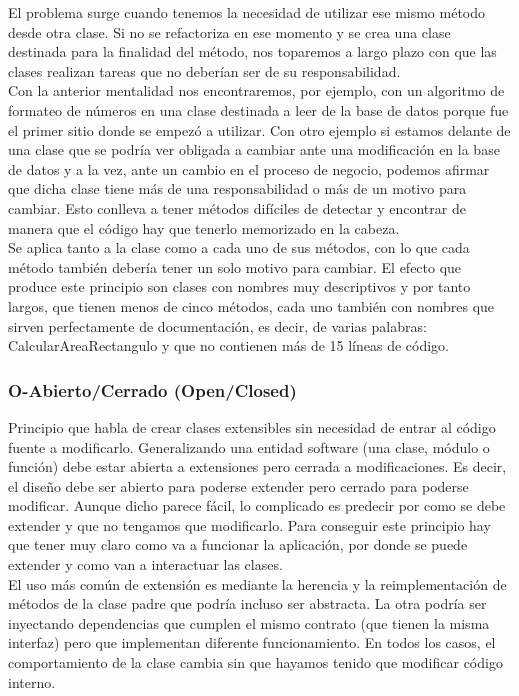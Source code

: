 \documentclass[../pfc.tex]{subfiles}
\begin{document}
	El problema surge cuando tenemos la necesidad de utilizar ese mismo método desde otra clase. Si no se refactoriza en ese momento y se crea una clase destinada para la finalidad del método, nos toparemos a largo plazo con que las clases realizan tareas que no deberían ser de su responsabilidad.\\
	
	Con la anterior mentalidad nos encontraremos, por ejemplo, con un algoritmo de formateo de números en una clase destinada a leer de la base de datos porque fue el primer sitio donde se empezó a utilizar. Con otro ejemplo si estamos delante de una clase que se podría ver obligada a cambiar ante una modificación en la base de datos y a la vez, ante un cambio en el proceso de negocio, podemos afirmar que dicha clase tiene más de una responsabilidad o más de un motivo para cambiar. Esto conlleva a tener métodos difíciles de detectar y encontrar de manera que el código hay que tenerlo memorizado en la cabeza.\\
	
	Se aplica tanto a la clase como a cada uno de sus métodos, con lo que cada método también debería tener un solo motivo para cambiar. El efecto que produce este principio son clases con nombres muy descriptivos y por tanto largos, que tienen menos de cinco métodos, cada uno también con nombres que sirven perfectamente de documentación, es decir, de varias palabras: CalcularAreaRectangulo y que no contienen más de 15 líneas de código.\\
	
	
	\subsubsection{O-Abierto/Cerrado (Open/Closed)}
	
	Principio que habla de crear clases extensibles sin necesidad de entrar al código fuente a modificarlo. Generalizando una entidad software (una clase, módulo o función) debe estar abierta a extensiones pero cerrada a modificaciones. Es decir, el diseño debe ser abierto para poderse extender pero cerrado para poderse modificar. Aunque dicho parece fácil, lo complicado es predecir por como se debe extender y que no tengamos que modificarlo. Para conseguir este principio hay que tener muy claro como va a funcionar la aplicación, por donde se puede extender y como van a interactuar las clases.\\
	
	El uso más común de extensión es mediante la herencia y la reimplementación de métodos de la clase padre que podría incluso ser abstracta. La otra podría ser inyectando dependencias que cumplen el mismo contrato (que tienen la misma interfaz) pero que implementan diferente funcionamiento. En todos los casos, el comportamiento de la clase cambia sin que hayamos tenido que modificar código interno.\\
		
\end{document}
